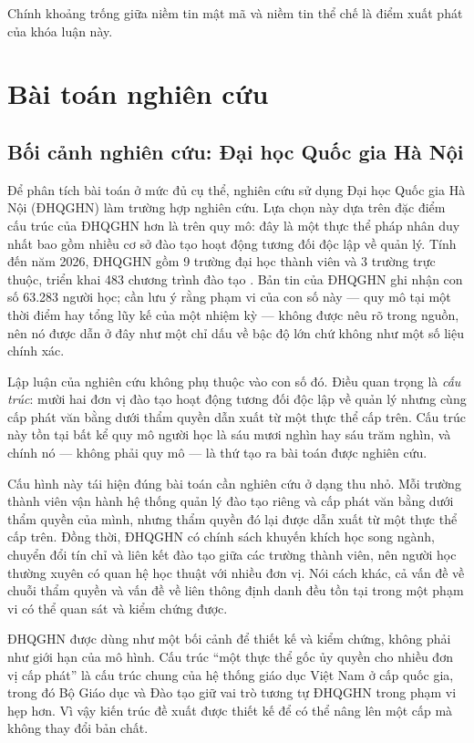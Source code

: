 Chính khoảng trống giữa niềm tin mật mã và niềm tin thể chế là điểm xuất phát của khóa luận này.

\section{Bài toán nghiên cứu}

\subsection{Bối cảnh nghiên cứu: Đại học Quốc gia Hà Nội}

Để phân tích bài toán ở mức đủ cụ thể, nghiên cứu sử dụng Đại học Quốc gia Hà Nội (ĐHQGHN) làm trường hợp nghiên cứu. Lựa chọn này dựa trên đặc điểm cấu trúc của ĐHQGHN hơn là trên quy mô: đây là một thực thể pháp nhân duy nhất bao gồm nhiều cơ sở đào tạo hoạt động tương đối độc lập về quản lý. Tính đến năm 2026, ĐHQGHN gồm 9 trường đại học thành viên và 3 trường trực thuộc, triển khai 483 chương trình đào tạo \cite{VNU_Report2026}. Bản tin của ĐHQGHN ghi nhận con số 63.283 người học; cần lưu ý rằng phạm vi của con số này --- quy mô tại một thời điểm hay tổng lũy kế của một nhiệm kỳ --- không được nêu rõ trong nguồn, nên nó được dẫn ở đây như một chỉ dấu về bậc độ lớn chứ không như một số liệu chính xác.

Lập luận của nghiên cứu không phụ thuộc vào con số đó. Điều quan trọng là \emph{cấu trúc}: mười hai đơn vị đào tạo hoạt động tương đối độc lập về quản lý nhưng cùng cấp phát văn bằng dưới thẩm quyền dẫn xuất từ một thực thể cấp trên. Cấu trúc này tồn tại bất kể quy mô người học là sáu mươi nghìn hay sáu trăm nghìn, và chính nó --- không phải quy mô --- là thứ tạo ra bài toán được nghiên cứu.

Cấu hình này tái hiện đúng bài toán cần nghiên cứu ở dạng thu nhỏ. Mỗi trường thành viên vận hành hệ thống quản lý đào tạo riêng và cấp phát văn bằng dưới thẩm quyền của mình, nhưng thẩm quyền đó lại được dẫn xuất từ một thực thể cấp trên. Đồng thời, ĐHQGHN có chính sách khuyến khích học song ngành, chuyển đổi tín chỉ và liên kết đào tạo giữa các trường thành viên, nên người học thường xuyên có quan hệ học thuật với nhiều đơn vị. Nói cách khác, cả vấn đề về chuỗi thẩm quyền và vấn đề về liên thông định danh đều tồn tại trong một phạm vi có thể quan sát và kiểm chứng được.

ĐHQGHN được dùng như một bối cảnh để thiết kế và kiểm chứng, không phải như giới hạn của mô hình. Cấu trúc {``}một thực thể gốc ủy quyền cho nhiều đơn vị cấp phát{''} là cấu trúc chung của hệ thống giáo dục Việt Nam ở cấp quốc gia, trong đó Bộ Giáo dục và Đào tạo giữ vai trò tương tự ĐHQGHN trong phạm vi hẹp hơn. Vì vậy kiến trúc đề xuất được thiết kế để có thể nâng lên một cấp mà không thay đổi bản chất.

